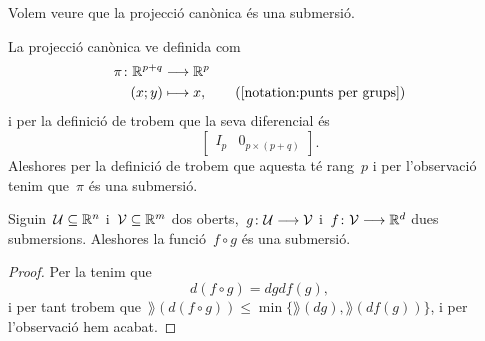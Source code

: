 \documentclass[../../Main.tex]{subfiles}
\begin{document}
	\begin{example}
		\label{ex:la projecció canònica és una submersió}
		Volem veure que la projecció canònica és una submersió.
		\begin{solution}
			La projecció canònica ve definida com
			\begin{align*}
				\pi\colon\mathbb{R}^{p+q}&\longrightarrow\mathbb{R}^{p} \\
				(x;y)&\longmapsto x, \tag{\ref{notation:punts per grups}}
			\end{align*}
			i per la definició de  trobem que la seva diferencial és
			\[\left[\begin{array}{c|c}
			I_{p} & 0_{p\times(p+q)}
			\end{array}\right].\]
			Aleshores per la definició de  trobem que aquesta té rang~\(p\) i per l'observació  tenim que~\(\pi\) és una submersió.
		\end{solution}
	\end{example}
	\begin{proposition}
		\label{prop:la composició de submersions és submersió}
		Siguin~\(\mathcal{U}\subseteq\mathbb{R}^{n}\) i~\(\mathcal{V}\subseteq\mathbb{R}^{m}\) dos oberts,~\(g\colon\mathcal{U}\longrightarrow\mathcal{V}\) i~\(f\colon\mathcal{V}\longrightarrow\mathbb{R}^{d}\) dues submersions.
		Aleshores la funció~\(f\circ g\) és una submersió.
		\begin{proof}
			Per la  tenim que
			\[
			    d(f\circ g)=dgdf(g),
			\]
			i per tant trobem que~\(\rang(d(f\circ g))\leq\min\{\rang(dg),\rang(df(g))\}\), i per l'observació  hem acabat.
		\end{proof}
	\end{proposition}
\end{document}
